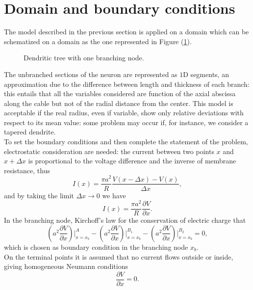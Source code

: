 \documentclass[a4paper,11pt ]{report}
\theoremstyle{definition}
\begin{document}
\section{Domain and boundary conditions}
The model described in the previous section is applied on a domain which can be schematized on a domain as the one represented in Figure (\ref{fig:hines_branch}).
\begin{figure}[h!]
\centering
{}
\caption{Dendritic tree with one branching node.}
\label{fig:hines_branch}
\end{figure}
The unbranched sections of the neuron are represented as $1$D segments, an approximation due to the difference between length and thickness of each branch: this entails that all the variables considered are function of the axial abscissa along the cable but not of the radial distance from the center. This model is acceptable if the real radius, even if variable, show only relative deviations with respect to its mean value: some problem may occur if, for instance, we consider a tapered dendrite.\\
To set the boundary conditions and then complete the statement of the problem, electrostatic consideration are needed: the current between two points $x$ and $x+\Delta x$ is proportional to the voltage difference and the inverse of membrane resistance, thus
\begin{equation*}
I(x)=\frac{\pi a^2}{R}\frac{V(x-\Delta x)-V(x)}{\Delta x},
\end{equation*}
and by taking the limit $\Delta x \rightarrow 0$ we have
\begin{equation*}
I(x)=\frac{\pi a^2}{R}\frac{\partial V}{\partial x}.
\end{equation*}
In the branching node, Kirchoff's law for the conservation of electric charge that 
\begin{equation*}
\left( a^2\frac{\partial V}{\partial x}\right)\bigg|_{x=x_b}^A-\left( a^2\frac{\partial V}{\partial x}\right)\bigg|_{x=x_b}^{B_1}-\left( a^2\frac{\partial V}{\partial x}\right)\bigg|_{x=x_b}^{B_2}=0,
\end{equation*}
which is chosen as boundary condition in the branching node $x_b$.\\
On the terminal points it is assumed that no current flows outside or inside, giving homogeneous Neumann conditions
\begin{equation*}
\frac{\partial V}{\partial x}=0.
\end{equation*}
\end{document}
